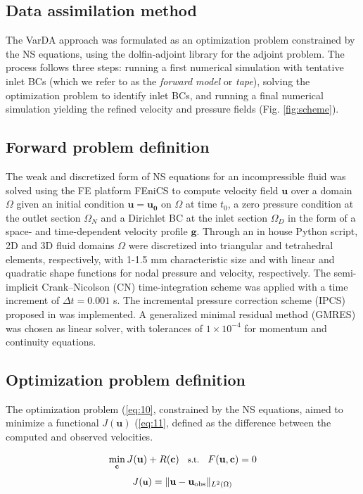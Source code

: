 \subsection*{Data assimilation method}
The VarDA approach was formulated as an optimization problem constrained by the NS equations, using the dolfin-adjoint library for the adjoint problem. The process follows three steps: running a first numerical simulation with tentative inlet BCs (which we refer to as the \emph{forward model} or \emph{tape}), solving the optimization problem to identify inlet BCs, and running a final numerical simulation yielding the refined velocity and pressure fields (Fig. \ref{fig:scheme}).

\subsection*{Forward problem definition}
The weak and discretized form of NS equations for an incompressible fluid \citep{Stokes2009} was solved using the FE platform FEniCS \citep{Alnaes2015} to compute velocity field $\textbf{u}$ over a domain $\Omega$ given an initial condition \(\mathbf{u}=\mathbf{u_0}\) on $\Omega$ at time $t_0$, a zero pressure condition at the outlet section $\Omega_N$ and a Dirichlet BC at the inlet section $\Omega_D$ in the form of a space- and time-dependent velocity profile $\textbf{g}$. Through an in house Python script, 2D and 3D fluid domains $\Omega$ were discretized into triangular and tetrahedral elements, respectively, with 1-1.5 mm characteristic size and with linear and quadratic shape functions for nodal pressure and velocity, respectively. The semi-implicit Crank--Nicolson (CN) time-integration scheme was applied with a time increment of $\Delta t = 0.001$ s. The incremental pressure correction scheme (IPCS) proposed in \citep{Goda1979} was implemented. A generalized minimal residual method (GMRES) was chosen as linear solver, with tolerances of $1 \times 10^{-4}$ for momentum and continuity equations.

\subsection*{Optimization problem definition}

The optimization problem (\cref{eq:10}, constrained by the NS equations, aimed to minimize a functional $J(\mathbf{u})$ (\cref{eq:11}, defined as the difference between the computed and observed velocities. 

\begin{equation}
\small
\min_{\mathbf{c}} J(\mathbf{u}) + R(\mathbf{c}) \quad \text{s.t.} \quad F(\mathbf{u}, \mathbf{c}) = 0
\label{eq:10}
\end{equation}
\begin{equation}
\small
    J(\textbf{u}) = \| \mathbf{u} - \mathbf{u}_{\text{obs}} \|_{L^2(\Omega)}
    \label{eq:11}
\end{equation}

